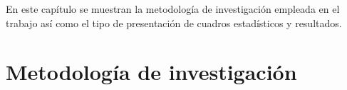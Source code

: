 \documentclass[../main/main.tex]{subfiles}
\begin{document}
\espacio
  En este capítulo se muestran la metodología de investigación empleada en el trabajo así como el tipo de presentación de cuadros estadísticos y resultados.

  \section{Metodología de investigación}
\end{document}
